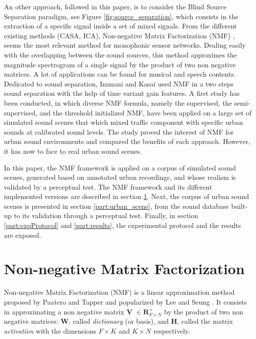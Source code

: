 \documentclass[review,5p,twocolumn,sort&compress,times]{elsarticle}
\begin{document}
An other approach, followed in this paper, is to consider the Blind Source Separation paradigm, see Figure \ref{fig:source_separation}, which consists in the extraction of a specific signal inside a set of mixed signals. From the different existing methods (CASA, ICA), Non-negative Matrix Factorization (NMF) \cite{lee_learning_1999}, seems the most relevant method for monophonic sensor networks. Dealing easily with the overlapping between the sound sources, this method approximes the magnitude spectrogram of a single signal by the product of two non negative matrices. A lot of applications can be found for musical \cite{smaragdis_non-negative_2003, benetos2006musical} and speech \cite{wilson_speech_2008, mysore2011non} contents. Dedicated to sound separation, Immani and Kasa\"i \cite{satoshi_innami_nmf-based_2012} used NMF in a two steps sound separation with the help of time variant gain features. A first study \cite{gloaguen2018Estimation} has been conducted, in which diverse NMF formula, namely the supervised, the semi-supervised, and the threshold initialized NMF, have been applied on a large set of simulated sound scenes that which mixed traffic component with specific urban sounds at calibrated sound levels. The study proved the interest of NMF for urban sound environments and compared the benefits of each approach. However, it has now to face to real urban sound scenes.

In this paper, the NMF framework is applied on a corpus of simulated sound scenes, generated based on annotated urban recordings, and whose realism is validated by a perceptual test. The NMF framework and its different implemented versions are described in section \ref{part:nmf}. Next, the corpus of urban sound scenes is presented in section \ref{part:urban_scene}, from the sound database built-up to its validation through a perceptual test. Finally, in section \ref{part:expProtocol} and \ref{part:results}, the experimental protocol and the results are exposed.

\section{Non-negative Matrix Factorization}\label{part:nmf}

Non-negative Matrix Factorization (NMF) is a linear approximation method proposed by Paatero and Tapper \cite{paatero1994positive} and popularized by Lee and Seung \cite{lee_learning_1999}. It consists in approximating a non negative matrix $\mathbf{V}$ $\in \mathbf{R}^+_{F \times N}$ by the product of two non negative matrices: $\mathbf{W}$, called \textit{dictionary} (or basis), and $\mathbf{H}$, called the matrix \textit{activation} with the dimensions $F \times K$ and $K \times N$ respectively. 
\end{document}
